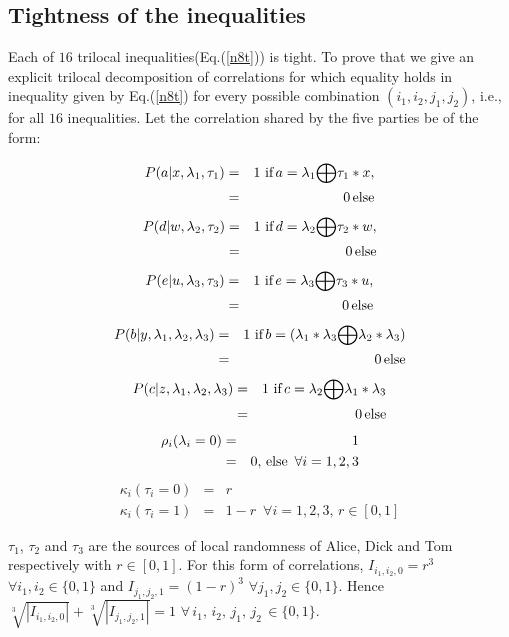 \documentclass[pra,10pt,twocolumn,superscriptaddress,floatfix,showpacs]{revtex4-1}
\begin{document}
\subsection{Tightness of the inequalities}\label{B}
Each of $16$ trilocal inequalities(Eq.(\ref{n8t})) is tight. To prove that we give an explicit trilocal decomposition of correlations for which equality holds in inequality given by Eq.(\ref{n8t}) for every possible combination $(i_1,i_2,j_1,j_2)$, i.e., for all $16$ inequalities. Let the correlation shared by the five parties be of the form:
\begin{center}
\begin{eqnarray*}
P(a|x,\lambda_1,\tau_1) &=& 1\,\, \textmd{if}\, a=\lambda_1\small{\bigoplus}\tau_1\ast x, \\
 &=& 0 \, \textmd{else}
\end{eqnarray*}
\begin{eqnarray*}
 P(d|w,\lambda_2,\tau_2) &=& 1\,\, \textmd{if}\, d=\lambda_2\small{\bigoplus}\tau_2\ast w, \\
 &=& 0 \, \textmd{else}
\end{eqnarray*}
\begin{eqnarray*}
 P(e|u,\lambda_3,\tau_3) &=& 1\,\, \textmd{if}\, e=\lambda_3\small{\bigoplus}\tau_3\ast u, \\
 &=& 0 \, \textmd{else}
\end{eqnarray*}
\begin{eqnarray*}
  P(b|y,\lambda_1,\lambda_2,\lambda_3) &=& 1\,\, \textmd{if}\, b=(\lambda_1*\lambda_3\small{\bigoplus}\lambda_2*\lambda_3)\\
   &=& 0 \, \textmd{else}
\end{eqnarray*}
\begin{eqnarray*}
  P(c|z,\lambda_1,\lambda_2,\lambda_3) &=& 1\,\, \textmd{if}\, c=\lambda_2\small{\bigoplus}\lambda_1*\lambda_3\\
   &=& 0 \, \textmd{else}
\end{eqnarray*}
\begin{eqnarray*}
  \rho_i(\lambda_i=0) &=& 1 \\
   &=& 0,\,\textmd{else}\,\,\,\forall i=1,2,3
\end{eqnarray*}
\begin{eqnarray*}
  \kappa_i(\tau_i=0) &=& r \\
  \kappa_i(\tau_i=1) &=& 1-r\,\,\,\forall i=1,2,3,\,r\in[0,1]
\end{eqnarray*}
\end{center}
 $\tau_1$, $\tau_2$ and $\tau_3$ are the sources of local randomness of Alice, Dick and Tom respectively with $r\in[0,1]$. For this form of correlations, $I_{i_1,i_2,0}=r^3$ $\forall i_1,i_2\in\{0,1\}$ and $I_{j_1,j_2,1}=(1-r)^3$ $\forall j_1,j_2\in\{0,1\}$. Hence $ \sqrt[3]{|I_{i_1,i_2,0}|}+\sqrt[3]{|I_{j_1,j_2,1}|}=1\,\,\forall\,i_1,\,i_2,\,j_1,\,j_2\,\in\{0,1\}.$\\
\end{document}
